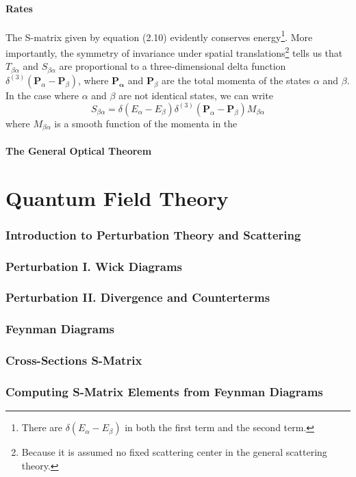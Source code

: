 \documentclass[12pt]{article}
\numberwithin{equation}{section}
\begin{document}
\subsection{Rates}
The S-matrix given by equation (2.10) evidently conserves energy\footnote{There are $\delta(E_{\alpha}-E_{\beta})$ in both the first term and the second term.}.
More importantly, the symmetry of invariance under spatial translations\footnote{Because it is assumed no fixed scattering center in the general scattering theory.} tells us that $T_{\beta\alpha}$ and $S_{\beta\alpha}$ are proportional to a three-dimensional delta function $\delta^{(3)}(\mathbf{P}_{\alpha}-\mathbf{P}_{\beta})$, where $\mathbf{P_{\alpha}}$ and $\mathbf{P}_{\beta}$ are the total momenta of the states $\alpha$ and $\beta$.
In the case where $\alpha$ and $\beta$ are not identical states, we can write 
\begin{equation}
    S_{\beta\alpha} = \delta(E_{\alpha}-E_{\beta})\delta^{(3)}(\mathbf{P}_{\alpha}-\mathbf{P}_{\beta})M_{\beta\alpha}
\end{equation}
where $M_{\beta\alpha}$ is a smooth function of the momenta in the 
\subsection{The General Optical Theorem}
\part{Quantum Field Theory}
\section{Introduction to Perturbation Theory and Scattering} 
\section{Perturbation I. Wick Diagrams}
\section{Perturbation II. Divergence and Counterterms}
\section{Feynman Diagrams}
\section{Cross-Sections S-Matrix}
\section{Computing S-Matrix Elements from Feynman Diagrams}
\end{document}
